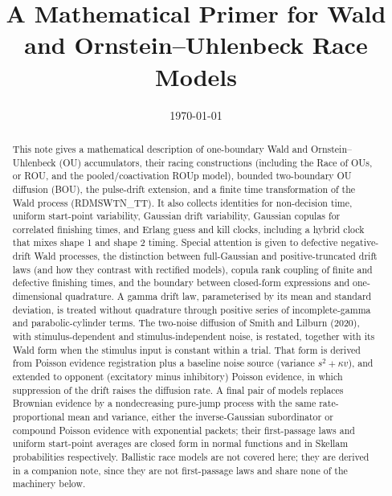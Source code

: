 \documentclass[12pt]{article}
\title{A Mathematical Primer for Wald and Ornstein--Uhlenbeck Race Models}
\author{}
\date{\today}
\begin{document}
\maketitle

\begin{abstract}
This note gives a mathematical description of one-boundary Wald and Ornstein--Uhlenbeck (OU) accumulators, their racing constructions (including the Race of OUs, or ROU, and the pooled/coactivation ROUp model), bounded two-boundary OU diffusion (BOU), the pulse-drift extension, and a finite time transformation of the Wald process (RDMSWTN\_TT). It also collects identities for non-decision time, uniform start-point variability, Gaussian drift variability, Gaussian copulas for correlated finishing times, and Erlang guess and kill clocks, including a hybrid clock that mixes shape 1 and shape 2 timing. Special attention is given to defective negative-drift Wald processes, the distinction between full-Gaussian and positive-truncated drift laws (and how they contrast with rectified models), copula rank coupling of finite and defective finishing times, and the boundary between closed-form expressions and one-dimensional quadrature. A gamma drift law, parameterised by its mean and standard deviation, is treated without quadrature through positive series of incomplete-gamma and parabolic-cylinder terms. The two-noise diffusion of Smith and Lilburn (2020), with stimulus-dependent and stimulus-independent noise, is restated, together with its Wald form when the stimulus input is constant within a trial. That form is derived from Poisson evidence registration plus a baseline noise source (variance $s^2+\kappa v$), and extended to opponent (excitatory minus inhibitory) Poisson evidence, in which suppression of the drift raises the diffusion rate. A final pair of models replaces Brownian evidence by a nondecreasing pure-jump process with the same rate-proportional mean and variance, either the inverse-Gaussian subordinator or compound Poisson evidence with exponential packets; their first-passage laws and uniform start-point averages are closed form in normal functions and in Skellam probabilities respectively. Ballistic race models are not covered here; they are derived in a companion note, since they are not first-passage laws and share none of the machinery below.
\end{abstract}

\tableofcontents
\newpage
\end{document}
